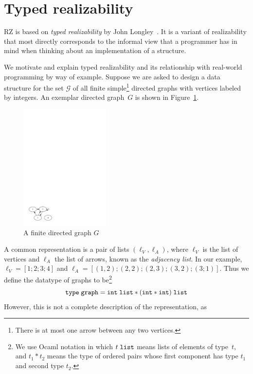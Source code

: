 \section{Typed realizability}
\label{sec:typed-realizability}

RZ is based on \emph{typed realizability} by John
Longley~\cite{Longley99}. It is a variant of realizability that most
directly corresponds to the informal view that a programmer has in
mind when thinking about an implementation of a structure.

We motivate and explain typed realizability and its relationship with
real-world programming by way of example. Suppose we are asked to
design a data structure for the set $\mathcal{G}$ of all finite
simple\footnote{There is at most one arrow between any two vertices.}
directed graphs with vertices labeled by integers. An exemplar
directed graph~$G$ is shown in Figure~\ref{fig:digraph}.
%
\begin{figure}
  \centering
  \includegraphics[width=0.4\textwidth]{digraph}
  \caption{A finite directed graph $G$}
  \label{fig:digraph}
\end{figure}
%
A common representation is a pair of lists $(\ell_V, \ell_A)$, where
$\ell_V$ is the list of vertices and $\ell_A$ the list of arrows,
known as the \emph{adjacency list}. In our example, $\ell_V = [1; 2;
3; 4]$ and $\ell_A = [(1,2); (2,2); (2,3); (3,2); (3;1)]$. Thus we
define the datatype of graphs to be\footnote{We use Ocaml notation in
  which $t\;\mathtt{list}$ means lists of elements of type~$t$, and
  $t_1 * t_2$ means the type of ordered pairs whose first component
  has type $t_1$ and second type $t_2$.}
%
\begin{equation*}
  \mathtt{type}\; \mathtt{graph} = \mathtt{int}\;\mathtt{list} * (\mathtt{int} * \mathtt{int})\;\mathtt{list}
\end{equation*}
%
However, this is not a complete description of the representation, as
